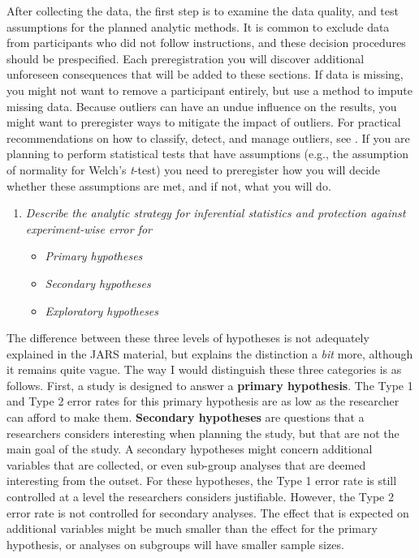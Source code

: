 \documentclass[
  oneside]{book}
\providecommand{\tightlist}{%
  \setlength{\itemsep}{0pt}\setlength{\parskip}{0pt}}
\begin{document}
After collecting the data, the first step is to examine the data quality, and test assumptions for the planned analytic methods. It is common to exclude data from participants who did not follow instructions, and these decision procedures should be prespecified. Each preregistration you will discover additional unforeseen consequences that will be added to these sections. If data is missing, you might not want to remove a participant entirely, but use a method to impute missing data. Because outliers can have an undue influence on the results, you might want to preregister ways to mitigate the impact of outliers. For practical recommendations on how to classify, detect, and manage outliers, see \citep{leys_how_2019}. If you are planning to perform statistical tests that have assumptions (e.g., the assumption of normality for Welch's \emph{t}-test) you need to preregister how you will decide whether these assumptions are met, and if not, what you will do.

\begin{enumerate}
\def\labelenumi{\arabic{enumi}.}
\setcounter{enumi}{5}
\tightlist
\item
  \emph{Describe the analytic strategy for inferential statistics and protection against experiment-wise error for}

  \begin{itemize}
  \tightlist
  \item
    \emph{Primary hypotheses}
  \item
    \emph{Secondary hypotheses}
  \item
    \emph{Exploratory hypotheses}
  \end{itemize}
\end{enumerate}

The difference between these three levels of hypotheses is not adequately explained in the JARS material, but \citet{cooper_reporting_2020} explains the distinction a \emph{bit} more, although it remains quite vague. The way I would distinguish these three categories is as follows. First, a study is designed to answer a \textbf{primary hypothesis}. The Type 1 and Type 2 error rates for this primary hypothesis are as low as the researcher can afford to make them. \textbf{Secondary hypotheses} are questions that a researchers considers interesting when planning the study, but that are not the main goal of the study. A secondary hypotheses might concern additional variables that are collected, or even sub-group analyses that are deemed interesting from the outset. For these hypotheses, the Type 1 error rate is still controlled at a level the researchers considers justifiable. However, the Type 2 error rate is not controlled for secondary analyses. The effect that is expected on additional variables might be much smaller than the effect for the primary hypothesis, or analyses on subgroups will have smaller sample sizes.
\end{document}

